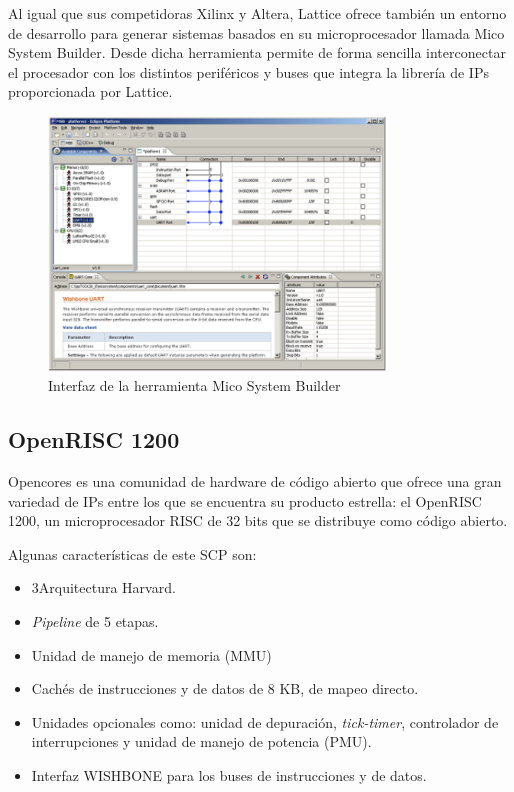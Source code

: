 Al igual que sus competidoras Xilinx y Altera, Lattice ofrece también un entorno de desarrollo para generar sistemas basados en su microprocesador
llamada Mico System Builder. Desde dicha herramienta permite de forma sencilla interconectar el procesador con los distintos periféricos y buses que
integra la librería de IPs proporcionada por Lattice.

\begin{figure}[h!]
 	\begin{center}
  	\includegraphics[width=0.8\textwidth,keepaspectratio=true]{./images/herramientaslatice}
  	\caption{Interfaz de la herramienta Mico System Builder}
 	\end{center}
	\end{figure}
\newpage
	\subsection{OpenRISC 1200}

Opencores \cite{Etiqueta20} es una comunidad de hardware de código abierto que ofrece una gran variedad de IPs entre los que se encuentra su producto estrella: el OpenRISC 1200, un microprocesador RISC de 32 bits que se distribuye como código abierto.

Algunas características de este SCP son:

\begin{itemize}
		 \item  3Arquitectura Harvard.
	 	 \item \textit{Pipeline} de 5 etapas.
	 	 \item  Unidad de manejo de memoria (MMU)
		 \item  Cachés de instrucciones y de datos de 8 KB, de mapeo directo.
 		\item Unidades opcionales como: unidad de depuración,\textit{ tick-timer}, controlador de interrupciones y unidad de manejo de potencia (PMU).
		\item Interfaz WISHBONE para los buses de instrucciones y de datos.
\end{itemize}
  
